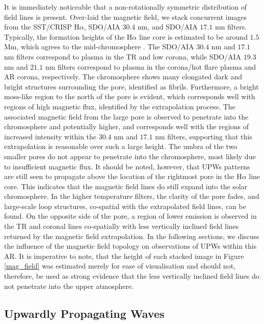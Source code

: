 	It is immediately noticeable that a non-rotationally symmetric distribution of field lines is present.
	Over-laid the magnetic field, we stack concurrent images from the SST/CRISP H$\alpha$, SDO/AIA $30.4$ nm, and SDO/AIA $17.1$ nm filters.
	Typically, the formation heights of the H$\alpha$ line core is estimated to be around $1.5$ Mm, which agrees to the mid-chromosphere \citep{Leenaarts2007}.
	The SDO/AIA $30.4$ nm and $17.1$ nm filters correspond to plasma in the TR and low corona, while SDO/AIA $19.3$ nm and $21.1$ nm filters correspond to plasma in the corona/hot flare plasma and AR corona, respectively.
	The chromosphere shows many elongated dark and bright structures surrounding the pore, identified as fibrils.
	Furthermore, a bright moss-like region to the north of the pore is evident, which corresponds well with regions of high magnetic flux, identified by the extrapolation process.
	The associated magnetic field from the large pore is observed to penetrate into the chromosphere and potentially higher, and corresponds well with the regions of increased intensity within the $30.4$ nm and $17.1$ nm filters, supporting that this extrapolation is reasonable over such a large height.
	The umbra of the two smaller pores do not appear to penetrate into the chromosphere, most likely due to insufficient magnetic flux.
	It should be noted, however, that UPWs patterns are still seen to propagate above the location of the rightmost pore in the H$\alpha$ line core.
	This indicates that the magnetic field lines do still expand into the solar chromosphere.
	In the higher temperature filters, the clarity of the pore fades, and large-scale loop structures, co-spatial with the extrapolated field lines, can be found.
	On the opposite side of the pore, a region of lower emission is observed in the TR and coronal lines co-spatially with less vertically inclined field lines returned by the magnetic field extrapolation.
	In the following sections, we discuss the influence of the magnetic field topology on observations of UPWs within this AR.
	It is imperative to note, that the height of each stacked image in Figure \ref{mag_field} was estimated merely for ease of visualisation and should not, therefore, be used as strong evidence that the less vertically inclined field lines do not penetrate into the upper atmosphere.

\subsection{Upwardly Propagating Waves}

